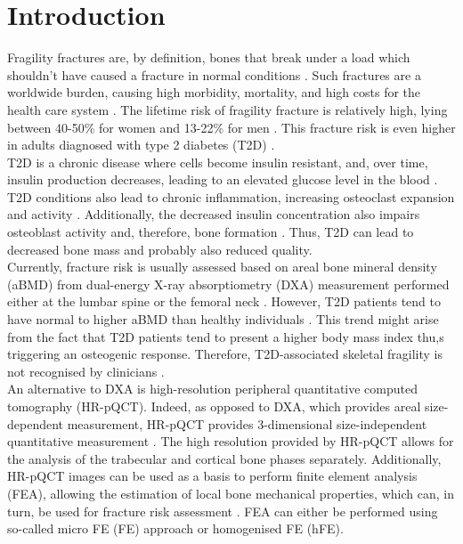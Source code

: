 \documentclass[a4paper,fleqn]{DC_ArtStyle}
\begin{document}
	\section{Introduction}
	Fragility fractures are, by definition, bones that break under a load which shouldn't have caused a fracture in normal conditions \cite{Kanis2001}.
	Such fractures are a worldwide burden, causing high morbidity, mortality, and high costs for the health care system \cite{Burge2007, Kanis2021}.
	The lifetime risk of fragility fracture is relatively high, lying between 40-50\% for women and 13-22\% for men \cite{Johnell2005}.
	This fracture risk is even higher in adults diagnosed with type 2 diabetes (T2D) \cite{Schwartz2001, Ahmed2005}.
	\\[0.5em]
	T2D is a chronic disease where cells become insulin resistant, and, over time, insulin production decreases, leading to an elevated glucose level in the blood \cite{Rogli2016}.
	T2D conditions also lead to chronic inflammation, increasing osteoclast expansion and activity \cite{Lespessailles2017}.
	Additionally, the decreased insulin concentration also impairs osteoblast activity and, therefore, bone formation \cite{Adami2009}.
	Thus, T2D can lead to decreased bone mass and probably also reduced quality.
	\\[0.5em]
	Currently, fracture risk is usually assessed based on areal bone mineral density (aBMD) from dual-energy X-ray absorptiometry (DXA) measurement performed either at the lumbar spine or the femoral neck \cite{Nuti2018}.
	However, T2D patients tend to have normal to higher aBMD than healthy individuals \cite{Ma2012}.
	This trend might arise from the fact that T2D patients tend to present a higher body mass index thu,s triggering an osteogenic response.
	Therefore, T2D-associated skeletal fragility is not recognised by clinicians \cite{Samelson2018}.
	\\[0.5em]
	An alternative to DXA is high-resolution peripheral quantitative computed tomography (HR-pQCT).
	Indeed, as opposed to DXA, which provides areal size-dependent measurement, HR-pQCT provides 3-dimensional size-independent quantitative measurement \cite{Whittier2020}.
	The high resolution provided by HR-pQCT allows for the analysis of the trabecular and cortical bone phases separately.
	Additionally, HR-pQCT images can be used as a basis to perform finite element analysis (FEA), allowing the estimation of local bone mechanical properties, which can, in turn, be used for fracture risk assessment \cite{Boutroy2008}.
	FEA can either be performed using so-called micro FE (\textmu FE) approach or homogenised FE (hFE).
\end{document}
